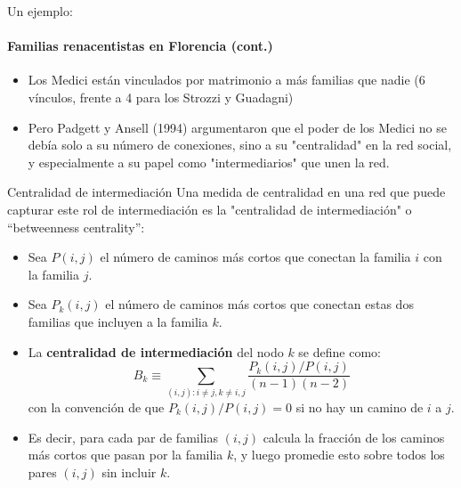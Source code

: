\documentclass[11pt]{beamer}
\begin{document}
\begin{frame}{Un ejemplo:}
\framesubtitle{Familias renacentistas en Florencia (cont.)}
\begin{itemize}
    \item Los Medici están vinculados por matrimonio a más familias que nadie (6 vínculos, frente a 4 para los Strozzi y Guadagni)
\item Pero Padgett y Ansell (1994) argumentaron que el poder de los Medici no se debía solo a su número de conexiones, sino a su "centralidad" en la red social, y especialmente a su papel como "intermediarios" que unen la red.
\end{itemize}

\end{frame}

\begin{frame}{Centralidad de intermediación}
Una medida de centralidad en una red que puede capturar este rol de intermediación es la "centralidad de intermediación" o ``betweenness centrality'':
\begin{itemize}
\small 
\item Sea $P (i, j )$ el número de caminos más cortos que conectan la familia $i$ con la familia $j$.
\item Sea $P_k (i, j )$ el número de caminos más cortos que conectan estas dos familias que incluyen a la familia $k$.
\item  La \textbf{centralidad de intermediación} del nodo $k$ se define como:
\begin{equation*}
B_k \equiv \sum_{(i,j): i\neq j, k\neq i,j} \frac{P_k (i, j)/P (i, j)}{(n-1) (n-2)}
\end{equation*}
con la convención de que $P_k (i, j)/P (i, j) = 0$ si no hay un camino de $i$ a $j$.
\item Es decir, para cada par de familias $(i, j )$ calcula la fracción de los caminos más cortos que pasan por la familia $k$, y luego promedie esto sobre todos los pares $(i, j )$ sin incluir $k$.
    \end{itemize}
\end{frame}
\end{document}
